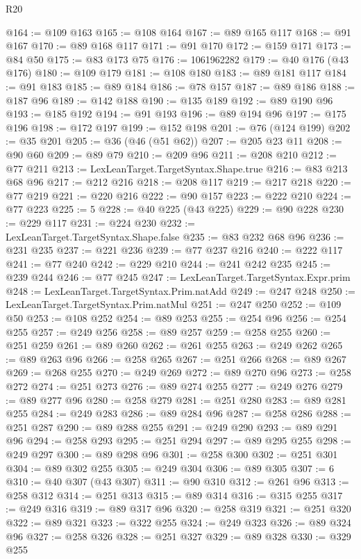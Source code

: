\begin{lexlean}{R20}
\begin{coremodule}
@164 := @109 @163
@165 := @108 @164
@167 := @89 @165 @117
@168 := @91 @167
@170 := @89 @168 @117
@171 := @91 @170
@172 := @159 @171
@173 := @84 @50
@175 := @83 @173 @75
@176 := 1061962282
@179 := @40 @176 (@43 @176)
@180 := @109 @179
@181 := @108 @180
@183 := @89 @181 @117
@184 := @91 @183
@185 := @89 @184
@186 := @78 @157
@187 := @89 @186
@188 := @187 @96
@189 := @142 @188
@190 := @135 @189
@192 := @89 @190 @96
@193 := @185 @192
@194 := @91 @193
@196 := @89 @194 @96
@197 := @175 @196
@198 := @172 @197
@199 := @152 @198
@201 := @76 (@124 @199)
@202 := @35 @201
@205 := @36 (@46 (@51 @62))
@207 := @205 @23 @11
@208 := @90 @60
@209 := @89 @79
@210 := @209 @96
@211 := @208 @210
@212 := @77 @211
@213 := LexLeanTarget.TargetSyntax.Shape.true
@216 := @83 @213 @68 @96
@217 := @212 @216
@218 := @208 @117
@219 := @217 @218
@220 := @77 @219
@221 := @220 @216
@222 := @90 @157
@223 := @222 @210
@224 := @77 @223
@225 := 5
@228 := @40 @225 (@43 @225)
@229 := @90 @228
@230 := @229 @117
@231 := @224 @230
@232 := LexLeanTarget.TargetSyntax.Shape.false
@235 := @83 @232 @68 @96
@236 := @231 @235
@237 := @221 @236
@239 := @77 @237 @216
@240 := @222 @117
@241 := @77 @240
@242 := @229 @210
@244 := @241 @242 @235
@245 := @239 @244
@246 := @77 @245
@247 := LexLeanTarget.TargetSyntax.Expr.prim
@248 := LexLeanTarget.TargetSyntax.Prim.natAdd
@249 := @247 @248
@250 := LexLeanTarget.TargetSyntax.Prim.natMul
@251 := @247 @250
@252 := @109 @50
@253 := @108 @252
@254 := @89 @253
@255 := @254 @96
@256 := @254 @255
@257 := @249 @256
@258 := @89 @257
@259 := @258 @255
@260 := @251 @259
@261 := @89 @260
@262 := @261 @255
@263 := @249 @262
@265 := @89 @263 @96
@266 := @258 @265
@267 := @251 @266
@268 := @89 @267
@269 := @268 @255
@270 := @249 @269
@272 := @89 @270 @96
@273 := @258 @272
@274 := @251 @273
@276 := @89 @274 @255
@277 := @249 @276
@279 := @89 @277 @96
@280 := @258 @279
@281 := @251 @280
@283 := @89 @281 @255
@284 := @249 @283
@286 := @89 @284 @96
@287 := @258 @286
@288 := @251 @287
@290 := @89 @288 @255
@291 := @249 @290
@293 := @89 @291 @96
@294 := @258 @293
@295 := @251 @294
@297 := @89 @295 @255
@298 := @249 @297
@300 := @89 @298 @96
@301 := @258 @300
@302 := @251 @301
@304 := @89 @302 @255
@305 := @249 @304
@306 := @89 @305
@307 := 6
@310 := @40 @307 (@43 @307)
@311 := @90 @310
@312 := @261 @96
@313 := @258 @312
@314 := @251 @313
@315 := @89 @314
@316 := @315 @255
@317 := @249 @316
@319 := @89 @317 @96
@320 := @258 @319
@321 := @251 @320
@322 := @89 @321
@323 := @322 @255
@324 := @249 @323
@326 := @89 @324 @96
@327 := @258 @326
@328 := @251 @327
@329 := @89 @328
@330 := @329 @255

\end{coremodule}
\end{lexlean}

